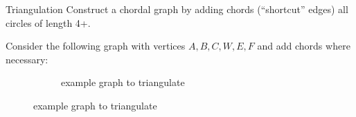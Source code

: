 \begin{frame}\frametitle{\subsubsecname}

\begin{block}{Triangulation}
Construct a chordal graph by adding chords (``shortcut'' edges) all circles of length 4+.
\end{block} 

Consider the following graph with vertices $A,B,C,W,E,F$ and add chords where necessary:\\


		\begin{figure}[h]
		 \centering
		 \begin{subfigure}[t]{0.35\textwidth}
			 \centering
			 \usebox{\imagebox}%
			 \caption{example graph to triangulate}
		 \end{subfigure}
		 \hspace{7mm}
		\end{figure}

\end{frame}


